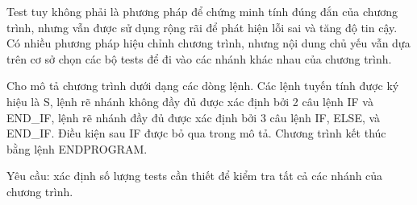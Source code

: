 Test tuy không phải là phương pháp để chứng minh tính đúng đắn của chương trình, nhưng vẫn được sử dụng rộng rãi để phát hiện lỗi sai và tăng độ tin cậy. Có nhiều phương pháp hiệu chỉnh chương trình, nhưng nội dung chủ yếu vẫn dựa trên cơ sở chọn các bộ tests để đi vào các nhánh khác nhau của chương trình.  

   Cho mô tả chương trình dưới dạng các dòng lệnh. Các lệnh tuyến tính được ký hiệu là S, lệnh rẽ nhánh không đầy đủ được xác định bởi 2 câu lệnh IF và END\_IF, lệnh rẽ nhánh đầy đủ được xác định bởi 3 câu lệnh IF, ELSE, và END\_IF. Điều kiện sau IF được bỏ qua trong mô tả. Chương trình kết thúc bằng lệnh ENDPROGRAM.  

   Yêu cầu: xác định số lượng tests cần thiết để kiểm tra tất cả các nhánh của chương trình.